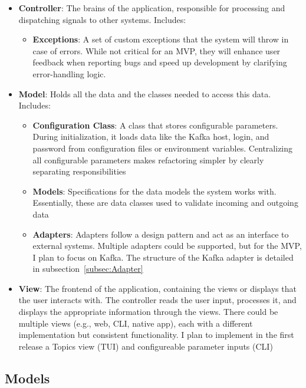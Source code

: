 \documentclass[10pt , a4paper]{report}
\begin{document}
\begin{itemize}
  \item \textbf{Controller}: The brains of the application, responsible for processing and dispatching signals to other systems. Includes:
    \begin{itemize}
      \item \textbf{Exceptions}: A set of custom exceptions that the system will throw in case of errors. While not critical for an MVP, they will enhance user feedback when reporting bugs and speed up development by clarifying error-handling logic.
    \end{itemize}

  \item \textbf{Model}: Holds all the data and the classes needed to access this data. Includes:
    \begin{itemize}
      \item \textbf{Configuration Class}: A class that stores configurable parameters. During initialization, it loads data like the Kafka host, login, and password from configuration files or environment variables. Centralizing all configurable parameters makes refactoring simpler by clearly separating responsibilities
      \item \textbf{Models}: Specifications for the data models the system works with. Essentially, these are data classes used to validate incoming and outgoing data
      \item \textbf{Adapters}: Adapters follow a design pattern and act as an interface to external systems. Multiple adapters could be supported, but for the MVP, I plan to focus on Kafka. The structure of the Kafka adapter is detailed in subsection~\ref{subsec:Adapter}
    \end{itemize}

  \item \textbf{View}: The frontend of the application, containing the views or displays that the user interacts with. The controller reads the user input, processes it, and displays the appropriate information through the views. There could be multiple views (e.g., web, CLI, native app), each with a different implementation but consistent functionality. I plan to implement in the first release a Topics view (TUI) and configureable parameter inputs (CLI)
\end{itemize}

\subsection{Models}
\end{document}
